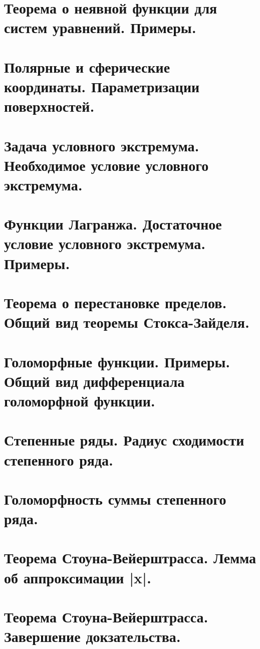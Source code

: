 \documentclass{article}
\theoremstyle{indented}
\theoremstyle{definition}
\theoremstyle{remark}
\begin{document}
\section{Теорема о неявной функции для систем уравнений. Примеры.}

\section{Полярные и сферические координаты. Параметризации поверхностей.}

\section{Задача условного экстремума. Необходимое условие условного экстремума.}

\section{Функции Лагранжа. Достаточное условие условного экстремума. Примеры.}

\section{Теорема о перестановке пределов. Общий вид теоремы Стокса-Зайделя.}

\section{Голоморфные функции. Примеры. Общий вид дифференциала голоморфной функции.}

\section{Степенные ряды. Радиус сходимости степенного ряда.}

\section{Голоморфность суммы степенного ряда.}

\section{Теорема Стоуна-Вейерштрасса. Лемма об аппроксимации |x|.}

\section{Теорема Стоуна-Вейерштрасса. Завершение докзательства.}
\end{document}
